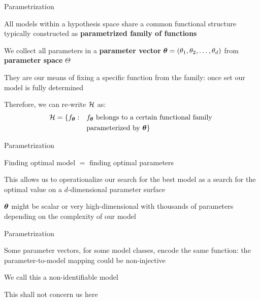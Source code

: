 \documentclass[11pt,compress,t,notes=noshow, xcolor=table]{beamer}
\begin{document}
\begin{framei}{Parametrization}  
\item All models within a hypothesis space share a common functional structure typically constructed as \textbf{parametrized family of functions}
\item We collect all parameters in a \textbf{parameter vector} $\bm{\theta} = (\theta_1, \theta_2, \ldots, \theta_d)$ from \textbf{parameter space} $\Theta$
\item They are our means of fixing a specific function from the family: once set our model is fully determined
\item Therefore, we can re-write $\mathcal{H}$ as:
\begin{equation*}
\begin{split}
\mathcal{H} = \{f_{\bm{\theta}}: \quad & f_{\bm{\theta}} \text{ belongs to a certain functional family } \\
& \text{parameterized by } \bm{\theta}\}
\end{split}
\end{equation*}
\end{framei}


\begin{framei}{Parametrization}
\item Finding optimal model $=$ finding optimal parameters
\item This allows us to operationalize our search for the best model as a search for the optimal value on a $d$-dimensional parameter surface
\item $\bm{\theta}$ might be scalar or very high-dimensional with thousands of parameters depending on the complexity of our model
\end{framei}


\begin{framei}[sep=L]{Parametrization}
\item Some parameter vectors, for some model classes, encode the same function: the parameter-to-model mapping could be non-injective
\item We call this a non-identifiable model
\item This shall not concern us here
\end{framei}
\end{document}
